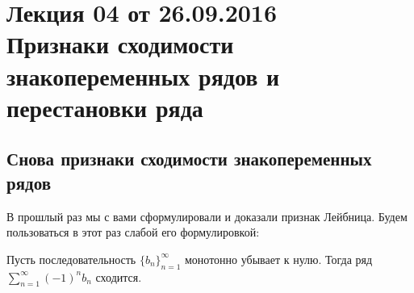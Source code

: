 \documentclass[a4paper, 12pt]{article}
\begin{document}
\pagestyle{fancy}
\section{Лекция 04 от 26.09.2016 \\ Признаки сходимости знакопеременных рядов и перестановки ряда}
\subsection{Снова признаки сходимости знакопеременных рядов}

В прошлый раз мы с вами сформулировали и доказали признак Лейбница. Будем пользоваться в этот раз слабой его формулировкой:
\begin{Test}
	Пусть последовательность $\{b_n\}_{n = 1}^{\infty}$ монотонно убывает к нулю. Тогда ряд $\sum\limits_{n = 1}^{\infty}(-1)^n b_n$ сходится. 
\end{Test}
\end{document}
